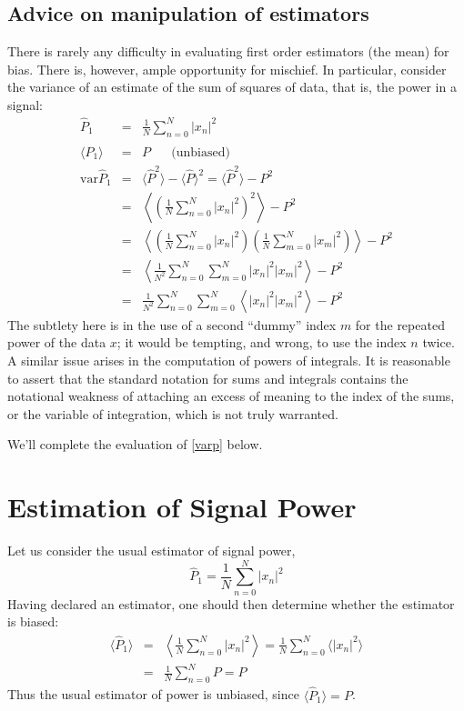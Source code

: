 \subsection{Advice on manipulation of estimators}
\label{s:estimator-advice}

There is rarely any difficulty in evaluating first order estimators
(the mean) for bias.  There is, however, ample opportunity for
mischief.  In particular, consider the variance of an estimate of the
sum of squares of data, that is, the power in a signal:
\begin{eqnarray}
\hat{P}_1 &=& \frac{1}{N} \sum_{n=0}^N |x_n|^2 \\
\langle \hat{P}_1 \rangle &=& P \;\;\;\;\;\; \textrm{(unbiased)} \\
\textrm{var} \hat{P}_1 &=& \langle \hat{P}^2 \rangle - \langle\hat{P}\rangle^2
= \langle \hat{P}^2 \rangle - P^2 \\
&=& \left\langle \left(\frac{1}{N} \sum_{n=0}^N |x_n|^2 \right)^2 \right\rangle
- P^2 \\
&=& \left\langle \left(\frac{1}{N} \sum_{n=0}^N |x_n|^2 \right)
  \left(\frac{1}{N} \sum_{m=0}^N |x_m|^2 \right) \right\rangle - P^2 \\
&=& \left\langle \frac{1}{N^2} \sum_{n=0}^N \sum_{m=0}^N |x_n|^2
  |x_m|^2 \right\rangle - P^2 \\
&=& \frac{1}{N^2} \sum_{n=0}^N \sum_{m=0}^N \left\langle |x_n|^2
  |x_m|^2 \right\rangle - P^2 \label{e:varp}
\end{eqnarray}
The subtlety here is in the use of a second ``dummy'' index $m$ for
the repeated power of the data $x$; it would be tempting, and wrong,
to use the index $n$ twice.  A similar issue arises in the computation
of powers of integrals.  It is reasonable to assert that the standard
notation for sums and integrals contains the notational weakness of
attaching an excess of meaning to the index of the sums, or the
variable of integration, which is not truly warranted.

We'll complete the evaluation of \eqref{varp} below.

\section{Estimation of Signal Power}

Let us consider the usual estimator of signal power,
\begin{equation}
\hat{P}_1 = \frac{1}{N}\sum_{n=0}^N |x_n|^2
\end{equation}
Having declared an estimator, one should then determine whether the
estimator is biased:
\begin{eqnarray}
\langle\hat{P}_1\rangle &=& 
\left\langle \frac{1}{N}\sum_{n=0}^N |x_n|^2 \right\rangle = \frac{1}{N}\sum_{n=0}^N \langle |x_n|^2
  \rangle \\
&=& \frac{1}{N}\sum_{n=0}^N P = P 
\end{eqnarray}
Thus the usual estimator of power is unbiased, since
$\langle \hat{P}_1\rangle = P$.  

